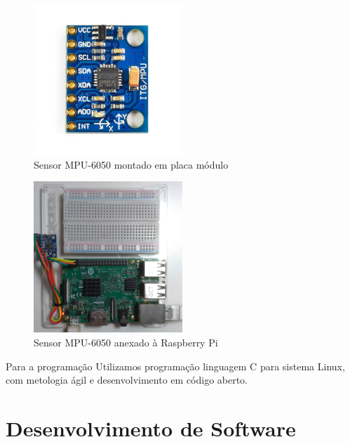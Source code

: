 \begin{figure}[H]
    \centering
    \caption{Sensor MPU-6050 montado em placa módulo}\label{fig:mpu6050-board-top}
    \includegraphics[width=0.5\textwidth]{figuras/mpu6050-board-top.jpg}
\end{figure}
\begin{figure}[H]
    \centering
    \caption{Sensor MPU-6050 anexado à Raspberry Pi}\label{fig:mpu6050-proto-top}
    \includegraphics[width=0.5\textwidth]{figuras/mpu6050-proto-top.jpg}
\end{figure}

Para a programação Utilizamos programação linguagem C para sistema Linux, com metologia ágil e desenvolvimento em código aberto.

\section{Desenvolvimento de Software}

